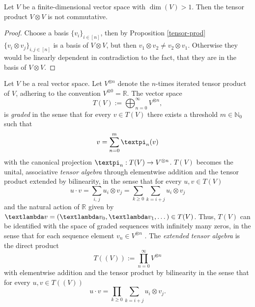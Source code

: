 \documentclass[openany]{book}
\begin{document}
\begin{proposition}
    Let $V$ be a finite-dimensional vector space with $\dim(V)> 1$. Then the tensor product $V\otimes V$ is not commutative.
    \begin{proof}
        Choose a basis $\{v_i\}_{i\in [n]}$, then by Proposition \ref{tensor-prod} $\{v_i\otimes v_j\}_{i,j\in [n]}$ is a basis of $V\otimes V$, but then $v_1\otimes v_2\neq v_2\otimes v_1$. Otherwise they would be linearly dependent in contradiction to the fact, that they are in the basis of $V\otimes V$.
    \end{proof}
\end{proposition}
\begin{definition}
    Let $V$ be a real vector space. Let $V^{\otimes n}$ denote the $n$-times iterated tensor product of $V$, adhering to the convention $V^{\otimes 0}=\mathbb R$. The vector space
    \begin{equation*}
        T(V):=\bigoplus_{n=0}^{\infty} V^{\otimes n},
    \end{equation*}
    is \textit{graded} in the sense that for every $v\in T(V)$ there exists a threshold $m\in \mathbb N_0$ such that
    \begin{equation*}
        v=\sum_{n=0}^m\gpi_n(v)
    \end{equation*}
    with the canonical projection $\gpi_n :T(V)\to V^{\otimes n}$. $T(V)$ becomes the unital, associative \textit{tensor algebra} through elementwise addition and the tensor product extended by bilinearity, in the sense that for every $u,v\in T(V)$ 
    \begin{equation*}
        u\cdot v=\sum_{i,\,j}u_i\otimes v_j=\sum_{k\geq 0}\sum_{k=i+j}u_i\otimes v_j
    \end{equation*}
    and the natural action of $\mathbb R$ given by $\glambda v=(\glambda v_0,\glambda v_1,\dots)\in T(V)$. Thus, $T(V)$ can be identified with the space of graded sequences with infinitely many zeros, in the sense that for each sequence element $v_n\in V^{\otimes n}$ \cite{greub1978}. The \textit{extended tensor algebra} is the direct product
    \begin{equation*}
        T((V)):=\prod_{n=0}^\infty V^{\otimes n}
    \end{equation*}
    with elementwise addition and the tensor product by bilinearity in the sense that for every $u,v\in T((V))$
    \begin{equation*}
        u\cdot v=\prod_{k\geq 0}\sum_{k=i+j}u_i\otimes v_j.
    \end{equation*}

\end{definition}
\end{document}
